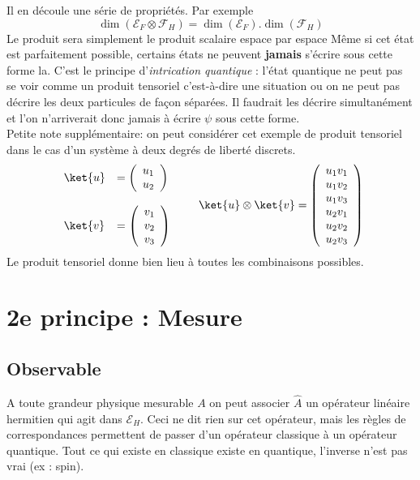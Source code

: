  Il en découle une série de propriétés. Par exemple
 \begin{equation}
 \dim(\mathcal{E}_F\otimes\mathcal{F}_H) = \dim(\mathcal{E}_F).
 \dim(\mathcal{F}_H)
 \end{equation}
 Le produit sera simplement le produit scalaire espace par espace
 Même si cet état est parfaitement possible, certains états ne peuvent 
 \textbf{jamais} s'écrire sous cette forme la. C'est le principe d'\textit{intrication 
 quantique }: l'état quantique ne peut pas se voir comme un produit 
 tensoriel c'est-à-dire une situation ou on ne peut pas décrire les deux particules 
 de façon séparées. Il faudrait les décrire simultanément et l'on n'arriverait donc jamais 
 à écrire $\psi$ sous cette forme.\\
 
 Petite note supplémentaire: on peut considérer cet exemple de produit tensoriel dans 
 le cas d'un système à deux degrés de liberté discrets.
 \begin{equation}
 \begin{array}{ll}
 \ket{u} &= \left(\begin{array}{c}
 u_1\\
 u_2
 \end{array}\right)\\
 &\\
  \ket{v} &= \left(\begin{array}{c}
 v_1\\
 v_2\\
 v_3
 \end{array}\right) 
 \end{array}\qquad \ket{u}\otimes\ket{v} = \left(\begin{array}{c}
 u_1v_1\\
 u_1v_2\\
 u_1v_3\\
 u_2v_1\\
 u_2v_2\\
 u_2v_3  
 \end{array}\right)
 \end{equation}
 Le produit tensoriel donne bien lieu à toutes les combinaisons possibles.
 
 
 \section{2e principe : Mesure}
 \subsection{Observable}
 A toute grandeur physique mesurable $A$ on peut associer $\hat{A}$ un 
 opérateur linéaire hermitien qui agit dans $\mathcal{E}_H$. 
 Ceci ne dit rien sur cet opérateur, mais les règles de 
 correspondances permettent de passer d'un opérateur classique à un opérateur quantique. 
 Tout ce qui existe en classique existe en quantique, l'inverse n'est pas
 vrai (ex : spin).
 
